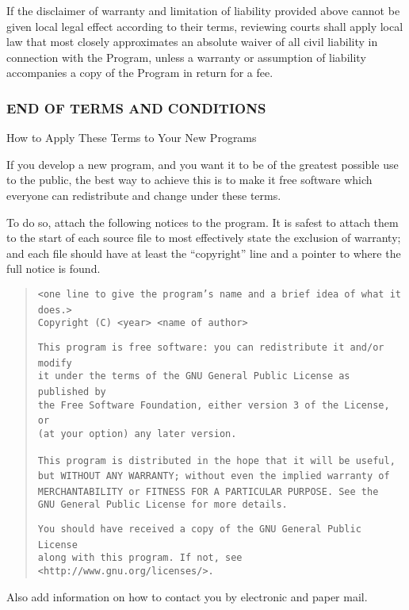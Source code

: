 \documentclass[10pt,english]{article}
\begin{document}
If the disclaimer of warranty and limitation of liability provided
above cannot be given local legal effect according to their terms,
reviewing courts shall apply local law that most closely approximates
an absolute waiver of all civil liability in connection with the Program,
unless a warranty or assumption of liability accompanies a copy of
the Program in return for a fee.


\subsubsection*{END OF TERMS AND CONDITIONS}

How to Apply These Terms to Your New Programs

If you develop a new program, and you want it to be of the greatest
possible use to the public, the best way to achieve this is to make
it free software which everyone can redistribute and change under
these terms.

To do so, attach the following notices to the program. It is safest
to attach them to the start of each source file to most effectively
state the exclusion of warranty; and each file should have at least
the \textquotedblleft{}copyright\textquotedblright{} line and a pointer
to where the full notice is found.
\begin{quote}
\texttt{<one line to give the program's name and a brief idea of what
it does.>}~\\
\texttt{Copyright (C) <year> <name of author>}

\texttt{This program is free software: you can redistribute it and/or
modify}~\\
\texttt{it under the terms of the GNU General Public License as published
by}~\\
\texttt{the Free Software Foundation, either version 3 of the License,
or}~\\
\texttt{(at your option) any later version.}

\texttt{This program is distributed in the hope that it will be useful,}~\\
\texttt{but WITHOUT ANY WARRANTY; without even the implied warranty
of}~\\
\texttt{MERCHANTABILITY or FITNESS FOR A PARTICULAR PURPOSE. See the}~\\
\texttt{GNU General Public License for more details.}

\texttt{You should have received a copy of the GNU General Public
License}~\\
\texttt{along with this program. If not, see <http://www.gnu.org/licenses/>.}
\end{quote}
Also add information on how to contact you by electronic and paper
mail.
\end{document}
